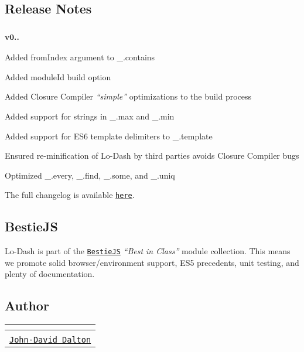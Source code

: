 \subsection*{Release Notes}

\subsubsection*{\textsuperscript{v0..}}


\begin{DoxyItemize}
\item Added {\ttfamily from\+Index} argument to {\ttfamily \+\_\+.\+contains}
\item Added {\ttfamily module\+Id} build option
\item Added Closure Compiler {\itshape “simple”} optimizations to the build process
\item Added support for strings in {\ttfamily \+\_\+.\+max} and {\ttfamily \+\_\+.\+min}
\item Added support for E\+S6 template delimiters to {\ttfamily \+\_\+.\+template}
\item Ensured re-\/minification of Lo-\/\+Dash by third parties avoids Closure Compiler bugs
\item Optimized {\ttfamily \+\_\+.\+every}, {\ttfamily \+\_\+.\+find}, {\ttfamily \+\_\+.\+some}, and {\ttfamily \+\_\+.\+uniq}
\end{DoxyItemize}

The full changelog is available \href{https://github.com/lodash/lodash/wiki/Changelog}{\tt here}.

\subsection*{Bestie\+JS}

Lo-\/\+Dash is part of the \href{https://github.com/bestiejs}{\tt Bestie\+JS} {\itshape “\+Best in Class”} module collection. This means we promote solid browser/environment support, E\+S5 precedents, unit testing, and plenty of documentation.

\subsection*{Author}

\tabulinesep=1mm
\begin{longtabu} spread 0pt [c]{*{1}{|X[-1]}|}
\hline
\rowcolor{\tableheadbgcolor}\textbf{ \href{http://twitter.com/jdalton}{\tt }  }\\
\endfirsthead
\hline
\endfoot
\hline
\rowcolor{\tableheadbgcolor}\textbf{ \href{http://twitter.com/jdalton}{\tt }  }\\
\endhead
\href{http://allyoucanleet.com/}{\tt John-\/\+David Dalton} \\
\end{longtabu}
